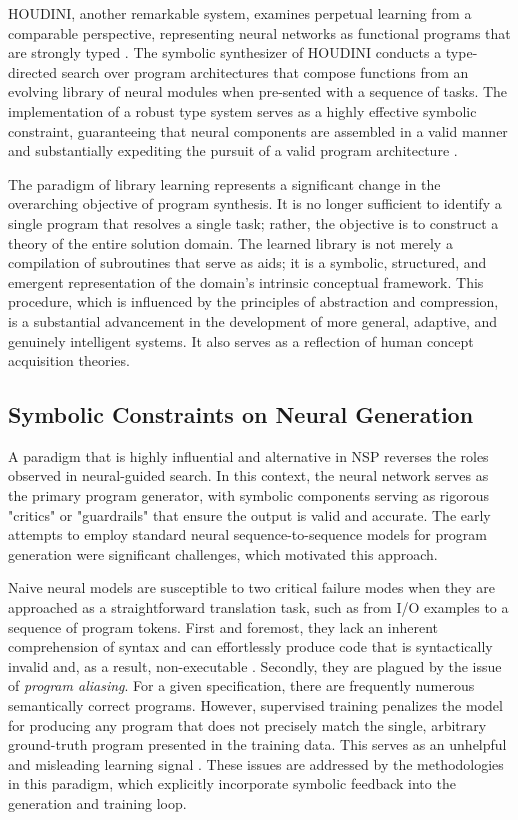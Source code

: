 \documentclass[12pt, a4paper]{report}
\begin{document}
HOUDINI, another remarkable system, examines perpetual learning from a comparable perspective, representing neural networks as functional programs that are strongly typed \citep{vered2022houdini}. The symbolic synthesizer of HOUDINI conducts a type-directed search over program architectures that compose functions from an evolving library of neural modules when pre-sented with a sequence of tasks.
The implementation of a robust type system serves as a highly effective symbolic constraint, guaranteeing that neural components are assembled in a valid manner and substantially expediting the pursuit of a valid program architecture \citep{vered2022houdini}.

The paradigm of library learning represents a significant change in the overarching objective of program synthesis. It is no longer sufficient to identify a single program that resolves a single task; rather, the objective is to construct a theory of the entire solution domain. The learned library is not merely a compilation of subroutines that serve as aids; it is a symbolic, structured, and emergent representation of the domain's intrinsic conceptual framework. This procedure, which is influenced by the principles of abstraction and compression, is a substantial advancement in the development of more general, adaptive, and genuinely intelligent systems. It also serves as a reflection of human concept acquisition theories.

\subsection{Symbolic Constraints on Neural Generation}
A paradigm that is highly influential and alternative in NSP reverses the roles observed in neural-guided search. In this context, the neural network serves as the primary program generator, with symbolic components serving as rigorous "critics" or "guardrails" that ensure the output is valid and accurate. The early attempts to employ standard neural sequence-to-sequence models for program generation were significant challenges, which motivated this approach.

Naive neural models are susceptible to two critical failure modes when they are approached as a straightforward translation task, such as from I/O examples to a sequence of program tokens. First and foremost, they lack an inherent comprehension of syntax and can effortlessly produce code that is syntactically invalid and, as a result, non-executable \citep{shah2020learning}.  Secondly, they are plagued by the issue of \textit{program aliasing}. For a given specification, there are frequently numerous semantically correct programs. However, supervised training penalizes the model for producing any program that does not precisely match the single, arbitrary ground-truth program presented in the training data. This serves as an unhelpful and misleading learning signal \citep{jin2022learning}. These issues are addressed by the methodologies in this paradigm, which explicitly incorporate symbolic feedback into the generation and training loop.
\end{document}
